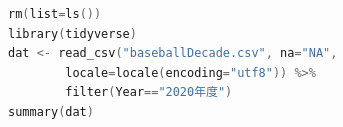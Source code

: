 \begin{lstlisting}[language=c++,label={code:11_01},caption={Initialization of environment, installation of packages, and reading of files}]
rm(list=ls())
library(tidyverse)
dat <- read_csv("baseballDecade.csv", na="NA", 
        locale=locale(encoding="utf8")) %>% 
        filter(Year=="2020年度")
summary(dat)
\end{lstlisting}
